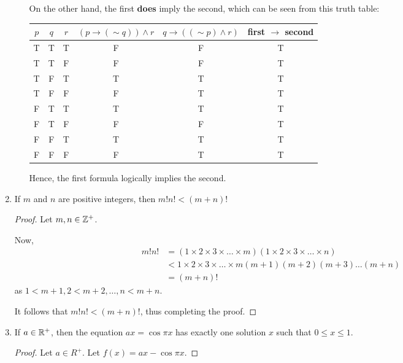 \begin{enumerate}
\begin{enumerate}
        On the other hand, the first \textbf{does} imply the second,
        which can be seen from this truth table:

        \begin{tabular}{c|c|c|c|c|c}
            $p$ & $q$ & $r$ & $(p \rightarrow (\sim q)) \wedge r$ &
                $q \rightarrow ((\sim p) \wedge r)$ &
                first $\rightarrow$ second \\
            \hline
            T & T & T & F & F & T \\
            T & T & F & F & F & T \\
            T & F & T & T & T & T \\
            T & F & F & F & T & T \\
            F & T & T & T & T & T \\
            F & T & F & F & F & T \\
            F & F & T & T & T & T \\
            F & F & F & F & T & T \\
        \end{tabular}

        Hence, the first formula logically implies the second.
    \end{enumerate}

\item
    \begin{theorem}
        If $m$ and $n$ are positive integers, then $m!n! < (m+n)!$
    \end{theorem}
    \begin{proof}
        Let $m, n \in \mathbb{Z}^+$.

        Now,
        \begin{align*}
            m!n! &= (1 \times 2 \times 3 \times \dots \times m)
                    (1 \times 2 \times 3 \times \dots \times n) \\
            &< 1 \times 2 \times 3 \times \dots \times m
                    (m+1)(m+2)(m+3)\dots(m+n) \\
            &= (m+n)!
        \end{align*}
        as $1 < m+1, 2 < m+2, \dots, n < m+n$.

        It follows that $m!n! < (m+n)!$, thus completing the proof.
    \end{proof}

\item
    \begin{theorem}
        If $a \in \mathbb{R}^+$, then the equation $ax = \cos \pi x$ has exactly
        one solution $x$ such that $0 \leq x \leq 1$.
    \end{theorem}
    \begin{proof}
        Let $a \in R^+$. Let $f(x) = ax - \cos \pi x$.


\end{proof}
\end{enumerate}
